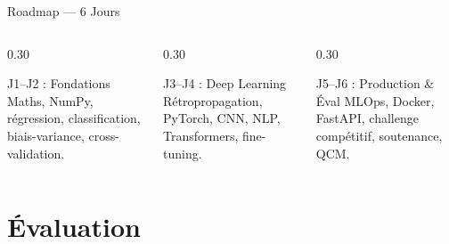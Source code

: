 \documentclass[aspectratio=169, 10pt]{beamer}
\begin{document}
\begin{frame}{Roadmap --- 6 Jours}
\begin{center}
  \end{center}

  \vspace{6pt}
  \begin{columns}[T]
    \begin{column}{0.30\textwidth}
      \begin{block}{\small J1--J2 : Fondations}
        \scriptsize Maths, NumPy, régression, classification,
        biais-variance, cross-validation.
      \end{block}
    \end{column}
    \begin{column}{0.30\textwidth}
      \begin{block}{\small J3--J4 : Deep Learning}
        \scriptsize Rétropropagation, PyTorch, CNN, NLP,
        Transformers, fine-tuning.
      \end{block}
    \end{column}
    \begin{column}{0.30\textwidth}
      \begin{block}{\small J5--J6 : Production \& Éval}
        \scriptsize MLOps, Docker, FastAPI, challenge
        compétitif, soutenance, QCM.
      \end{block}
    \end{column}
  \end{columns}
\end{frame}

\section{Évaluation}
\end{document}
